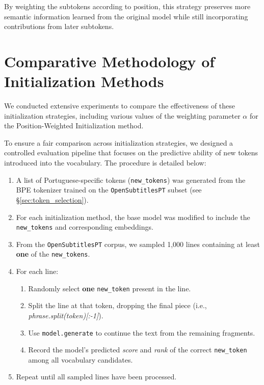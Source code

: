 By weighting the subtokens according to position, this strategy preserves more semantic information learned from the original model while still incorporating contributions from later subtokens.


\section{Comparative Methodology of Initialization Methods}
\label{sec:init_methodology}

We conducted extensive experiments to compare the effectiveness of these initialization strategies, including various values of the weighting parameter $\alpha$ for the Position-Weighted Initialization method.

To ensure a fair comparison across initialization strategies, we designed a controlled evaluation pipeline that focuses on the predictive ability of new tokens introduced into the vocabulary. The procedure is detailed below:

\begin{enumerate}
    \item A list of Portuguese-specific tokens (\texttt{new\_tokens}) was generated from the BPE tokenizer trained on the \texttt{OpenSubtitlesPT} subset (see \S\ref{sec:token_selection}).
    \item For each initialization method, the base model was modified to include the \texttt{new\_tokens} and corresponding embeddings.
    \item From the \texttt{OpenSubtitlesPT} corpus, we sampled 1,000 lines containing at least \textbf{one} of the \texttt{new\_tokens}.
    \item For each line:
        \begin{enumerate}
            \item Randomly select \textbf{one} \texttt{new\_token} present in the line.
            \item Split the line at that token, dropping the final piece (i.e., \textit{phrase.split(token)[:-1]}).
            \item Use \texttt{model.generate} to continue the text from the remaining fragments.
            \item Record the model's predicted \emph{score} and \emph{rank} of the correct \texttt{new\_token} among all vocabulary candidates.
        \end{enumerate}
    \item Repeat until all sampled lines have been processed.
\end{enumerate}

